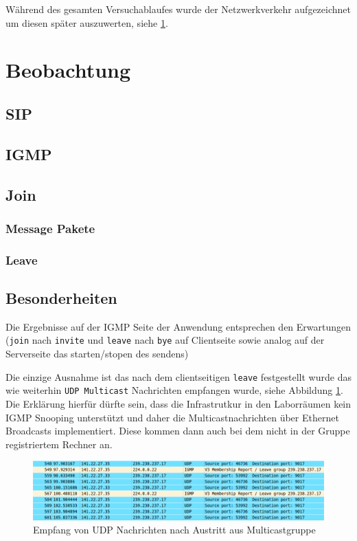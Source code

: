 \documentclass[10pt]{scrartcl}
\begin{document}
Während des gesamten Versuchablaufes wurde der Netzwerkverkehr aufgezeichnet um diesen später auszuwerten, siehe \ref{sec:beobachtung}.
	
\section{Beobachtung} \label{sec:beobachtung}

\subsection{SIP}

\subsection{IGMP}

	\subsection{Join}
	
	
	\subsubsection{Message Pakete}
	
	\subsubsection{Leave}
	
	
	\subsection{Besonderheiten}
	
	Die Ergebnisse auf der IGMP Seite der Anwendung entsprechen den Erwartungen (\verb!join! nach \verb!invite! und \verb!leave! nach \verb!bye! auf Clientseite sowie analog auf der Serverseite das starten/stopen des sendens)
	
	Die einzige Ausnahme ist das nach dem clientseitigen \verb!leave! festgestellt wurde das wie weiterhin \verb!UDP Multicast! Nachrichten empfangen wurde, siehe Abbildung \ref{img:cap1}. 
	Die Erklärung hierfür dürfte sein, dass die Infrastrutkur in den Laborräumen kein IGMP Snooping unterstützt und daher die Multicastnachrichten über Ethernet Broadcasts implementiert. Diese kommen dann auch bei dem nicht in der Gruppe registriertem Rechner an.
	
	
	\begin{figure}[htb]
        \centering
         \includegraphics[width=\textwidth]{img/udp_after_leaving}
         \caption{Empfang von UDP Nachrichten nach Austritt aus Multicastgruppe}
        \label{img:cap1}
	\end{figure}	
\end{document}
